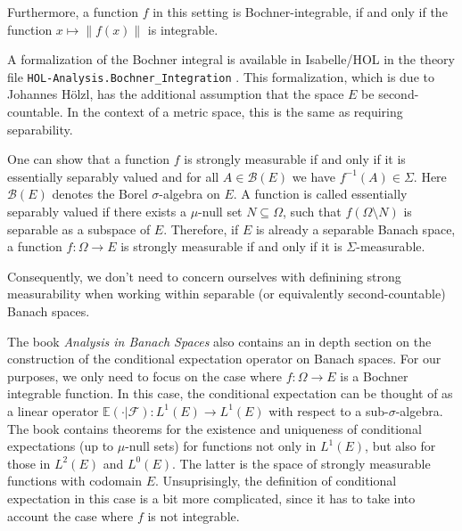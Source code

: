 Furthermore, a function $f$ in this setting is Bochner-integrable, if and only if the function $x \mapsto \lVert f(x) \rVert$ is integrable.

\vspace{0.3cm}
\relax
{}\relax

A formalization of the Bochner integral is available in Isabelle/HOL in the theory file \texttt{HOL-Analysis.Bochner\_Integration} \cite{hoelzl2011measuretheory}. This formalization, which is due to Johannes Hölzl, has the additional assumption that the space $E$ be second-countable. In the context of a metric space, this is the same as requiring separability.
\vspace{0.3cm}
\begin{remark}

One can show that a function $f$ is strongly measurable if and only if it is essentially separably valued and for all $A \in \mathcal{B}(E)$ we have $f^{-1}(A) \in \Sigma$. Here $\mathcal{B}(E)$ denotes the Borel $\sigma$-algebra on $E$. A function is called essentially separably valued if there exists a $\mu$-null set $N \subseteq \Omega$, such that $f (\Omega \setminus N)$ is separable as a subspace of $E$. Therefore, if $E$ is already a separable Banach space, a function $f : \Omega \rightarrow E$ is strongly measurable if and only if it is $\Sigma$-measurable.

Consequently, we don't need to concern ourselves with definining strong measurability when working within separable (or equivalently second-countable) Banach spaces.
\end{remark}
\vspace{0.3cm}

The book \textit{Analysis in Banach Spaces} also contains an in depth section on the construction of the conditional expectation operator on Banach spaces. For our purposes, we only need to focus on the case where $f : \Omega \rightarrow E$ is a Bochner integrable function. In this case, the conditional expectation can be thought of as a linear operator $\mathbb{E}(\cdot\vert\mathcal{F}) : L^1(E) \rightarrow L^1(E)$ with respect to a sub-$\sigma$-algebra. The book contains theorems for the existence and uniqueness of conditional expectations (up to $\mu$-null sets) for functions not only in $L^1(E)$, but also for those in $L^2(E)$ and $L^0(E)$. The latter is the space of strongly measurable functions with codomain $E$. Unsuprisingly, the definition of conditional expectation in this case is a bit more complicated, since it has to take into account the case where $f$ is not integrable.

